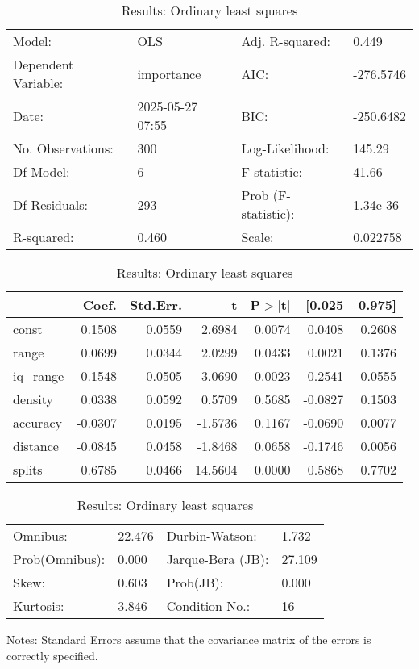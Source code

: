 \begin{table}
\caption{Results: Ordinary least squares}
\label{}
\begin{center}
\begin{tabular}{llll}
\hline
Model:              & OLS              & Adj. R-squared:     & 0.449      \\
Dependent Variable: & importance       & AIC:                & -276.5746  \\
Date:               & 2025-05-27 07:55 & BIC:                & -250.6482  \\
No. Observations:   & 300              & Log-Likelihood:     & 145.29     \\
Df Model:           & 6                & F-statistic:        & 41.66      \\
Df Residuals:       & 293              & Prob (F-statistic): & 1.34e-36   \\
R-squared:          & 0.460            & Scale:              & 0.022758   \\
\hline
\end{tabular}
\end{center}

\begin{center}
\begin{tabular}{lrrrrrr}
\hline
          &   Coef. & Std.Err. &       t & P$> |$t$|$ &  [0.025 &  0.975]  \\
\hline
const     &  0.1508 &   0.0559 &  2.6984 &      0.0074 &  0.0408 &  0.2608  \\
range     &  0.0699 &   0.0344 &  2.0299 &      0.0433 &  0.0021 &  0.1376  \\
iq\_range & -0.1548 &   0.0505 & -3.0690 &      0.0023 & -0.2541 & -0.0555  \\
density   &  0.0338 &   0.0592 &  0.5709 &      0.5685 & -0.0827 &  0.1503  \\
accuracy  & -0.0307 &   0.0195 & -1.5736 &      0.1167 & -0.0690 &  0.0077  \\
distance  & -0.0845 &   0.0458 & -1.8468 &      0.0658 & -0.1746 &  0.0056  \\
splits    &  0.6785 &   0.0466 & 14.5604 &      0.0000 &  0.5868 &  0.7702  \\
\hline
\end{tabular}
\end{center}

\begin{center}
\begin{tabular}{llll}
\hline
Omnibus:       & 22.476 & Durbin-Watson:    & 1.732   \\
Prob(Omnibus): & 0.000  & Jarque-Bera (JB): & 27.109  \\
Skew:          & 0.603  & Prob(JB):         & 0.000   \\
Kurtosis:      & 3.846  & Condition No.:    & 16      \\
\hline
\end{tabular}
\end{center}
\end{table}
\bigskip
Notes: \newline 
[1] Standard Errors assume that the covariance matrix of the errors is correctly specified.
